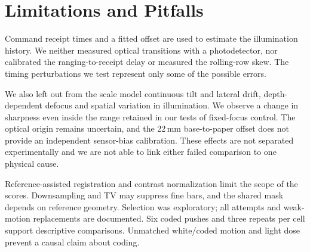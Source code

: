 \section{Limitations and Pitfalls}
Command receipt times and a fitted offset are used to estimate the illumination history. We neither measured optical transitions with a photodetector, nor calibrated the ranging-to-receipt delay or measured the rolling-row skew. The timing perturbations we test represent only some of the possible errors.

We also left out from the scale model continuous tilt and lateral drift, depth-dependent defocus and spatial variation in illumination. We observe a change in sharpness even inside the range retained in our tests of fixed-focus control. The optical origin remains uncertain, and the 22\,mm base-to-paper offset does not provide an independent sensor-bias calibration. These effects are not separated experimentally and we are not able to link either failed comparison to one physical cause.

Reference-assisted registration and contrast normalization limit the scope of the scores. Downsampling and TV may suppress fine bars, and the shared mask depends on reference geometry. Selection was exploratory; all attempts and weak-motion replacements are documented. Six coded pushes and three repeats per cell support descriptive comparisons. Unmatched white/coded motion and light dose prevent a causal claim about coding.

